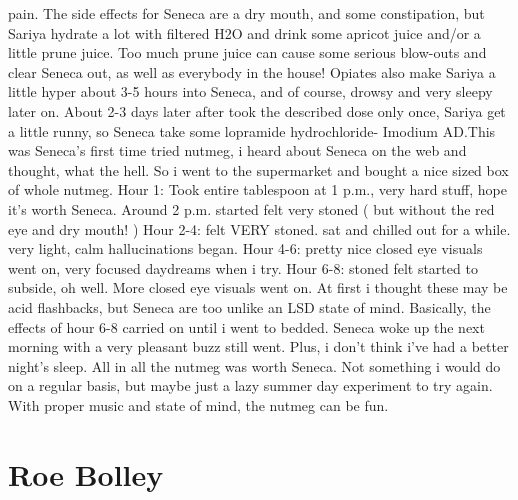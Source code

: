 \documentclass[12pt]{book}
\begin{document}
pain. The side effects for Seneca are a dry mouth, and some constipation, but Sariya hydrate a lot with filtered H2O and drink some apricot juice and/or a little prune juice. Too much prune juice can cause some serious blow-outs and clear Seneca out, as well as everybody in the house! Opiates also make Sariya a little hyper about 3-5 hours into Seneca, and of course, drowsy and very sleepy later on. About 2-3 days later after took the described dose only once, Sariya get a little runny, so Seneca take some lopramide hydrochloride- Imodium AD.This was Seneca's first time tried nutmeg, i heard about Seneca on the web and thought, what the hell. So i went to the supermarket and bought a nice sized box of whole nutmeg. Hour 1: Took entire tablespoon at 1 p.m., very hard stuff, hope it's worth Seneca. Around 2 p.m. started felt very stoned ( but without the red eye and dry mouth! ) Hour 2-4: felt VERY stoned. sat and chilled out for a while. very light, calm hallucinations began. Hour 4-6: pretty nice closed eye visuals went on, very focused daydreams when i try. Hour 6-8: stoned felt started to subside, oh well. More closed eye visuals went on. At first i thought these may be acid flashbacks, but Seneca are too unlike an LSD state of mind. Basically, the effects of hour 6-8 carried on until i went to bedded. Seneca woke up the next morning with a very pleasant buzz still went. Plus, i don't think i've had a better night's sleep. All in all the nutmeg was worth Seneca. Not something i would do on a regular basis, but maybe just a lazy summer day experiment to try again. With proper music and state of mind, the nutmeg can be fun.



\chapter{Roe Bolley}
\end{document}

